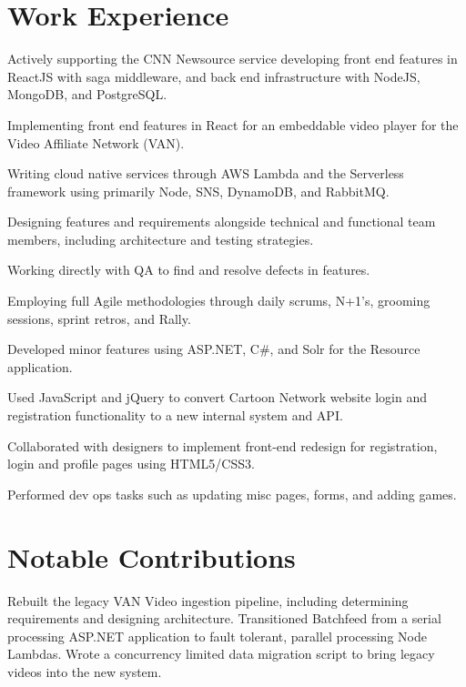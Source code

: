 \documentclass[]{deedy-resume-openfont}
\begin{document}
\begin{minipage}[t]{0.66\textwidth}
\section{Work Experience}
\vspace{\topsep} %
\begin{tightemize}
\item Actively supporting the CNN Newsource service developing front end features in ReactJS with saga middleware, and back end infrastructure with NodeJS, MongoDB, and PostgreSQL. 
\item Implementing front end features in React for an embeddable video player for the Video Affiliate Network (VAN).
\item Writing cloud native services through AWS Lambda and the Serverless framework using primarily Node, SNS, DynamoDB, and RabbitMQ.
\item Designing features and requirements alongside technical and functional team members, including architecture and testing strategies.
\item Working directly with QA to find and resolve defects in features.
\item Employing full Agile methodologies through daily scrums, N+1's, grooming sessions, sprint retros, and Rally.
\item Developed minor features using ASP.NET, C\#, and Solr for the Resource application.
\end{tightemize}
\sectionsep

\begin{tightemize}
\item Used JavaScript and jQuery to convert Cartoon Network website login and registration functionality to a new internal system and API.
\item Collaborated with designers to implement front-end redesign for registration, login and profile pages using HTML5/CSS3.
\item Performed dev ops tasks such as updating misc pages, forms, and adding games.
\end{tightemize}
\sectionsep

\section{Notable Contributions}
Rebuilt the legacy VAN Video ingestion pipeline, including determining requirements and designing architecture. Transitioned Batchfeed from a serial processing ASP.NET application to fault tolerant, parallel processing Node Lambdas. Wrote a concurrency limited data migration script to bring legacy videos into the new system.
\sectionsep


\end{minipage}
\end{document}
